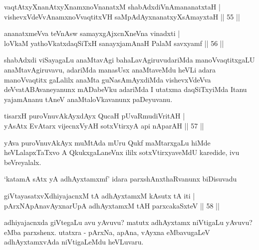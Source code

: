 
\begin{shl}
vaqtAtxyXnanAtxyXnamxnoV\s nanatxM shabAdxdiVnAmananatxtaH |\\
vishevxVdeVvAnamxnoVvaqtitxVH saMpAdAyx\s \s nanatxyXsAmayxtaH \hfill || 55 || 
\end{shl}

\begin{shl}
ananatxmeVva teVnAsw samayxgAjxcnXneVna vinadxti |\\
loVkaM yathoVkatxdaqSiTxH sanayxjamAnaH PalaM savxyamf \hfill || 56 ||
\end{shl}

\begin{artha}
shabAdxdi viSayagaLu anaMtavAgi bahaLavAgiruvudariMda manoVvaqtitxgaLU anaMtavAgiruvavu, adariMda manasUsx anaMtaveMdu heVLi adara manoVvaqtitx	gaLalilx anaMta guNasAmAyxdiMda vishevxVdeVva deVvatABAvaneyanunx mADabeVku adariMda I utatxma daqSiTxyiMda Itanu yajamAnanu tAneV anaMtaloVkavanunx paDeyuvanu.
\end{artha}


\begin{shl}
tisarxH puroVnuvAkAyxdAyx QucaH pUvaRmudiVritAH |\\
yAsAtx EvAtarx vijecnxVyAH sotxVtirxyA api nAparAH \hfill || 57 ||
\end{shl}

\begin{artha}
yAva puroVnuvAkAyx muMtAda mUru Qukf maMtarxgaLu hiMde heVLalapxTaTxvo A QkukxgaLaneVnx ililx sotxVtirxyaveMdU karedide, ivu beVreyalalx.
\end{artha}

\begin{artha}
`katamA sAtx yA adhAyxtamxmf' \mdash  idara parxshAnxthaRvanunx biDisuvadu \mdash 
\end{artha}

\begin{shl}
giVtayasatxvXdhiyajacnxM tA adhAyxtamxM kAsutx tA iti |\\
pArxNApAnavAyxnarUpA adhAyxtamxM tAH parxcakaSxteV \hfill || 58 ||
\end{shl}

\begin{artha}
adhiyajacnxda giVtegaLu avu yAvuvu? matutx adhAyxtamx niVtigaLu yAvuvu? eMba parxshenx. utatxra - pArxNa, apAna, vAyxna eMbavugaLeV adhAyxtamxvAda niVtigaLeMdu heVLuvaru.
\end{artha}

